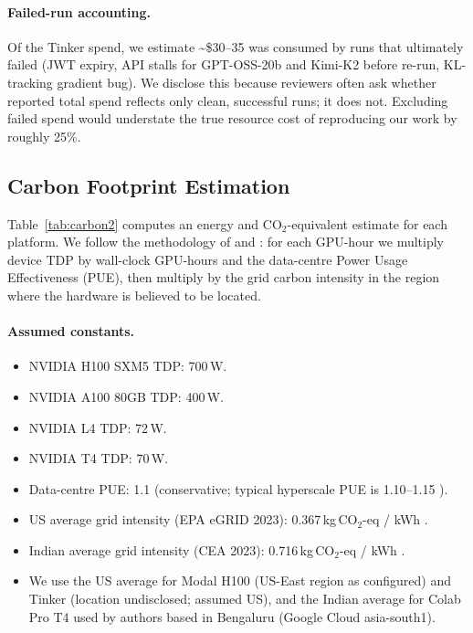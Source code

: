 \paragraph{Failed-run accounting.} Of the Tinker spend, we estimate
\textasciitilde\$30--35 was consumed by runs that ultimately failed
(JWT expiry, API stalls for GPT-OSS-20b and Kimi-K2 before re-run,
KL-tracking gradient bug). We disclose this because reviewers often ask
whether reported total spend reflects only clean, successful runs; it does
not. Excluding failed spend would understate the true resource cost of
reproducing our work by roughly 25\%.

\subsection{Carbon Footprint Estimation}
\label{sec:carbon}

Table~\ref{tab:carbon2} computes an energy and CO$_2$-equivalent estimate
for each platform. We follow the methodology of
\citet{patterson2024empirical} and \citet{strubell2019energy}: for each
GPU-hour we multiply device TDP by wall-clock GPU-hours and the data-centre
Power Usage Effectiveness (PUE), then multiply by the grid carbon intensity
in the region where the hardware is believed to be located.

\paragraph{Assumed constants.}
\begin{itemize}
  \item NVIDIA H100 SXM5 TDP: 700\,W.
  \item NVIDIA A100 80GB TDP: 400\,W.
  \item NVIDIA L4 TDP: 72\,W.
  \item NVIDIA T4 TDP: 70\,W.
  \item Data-centre PUE: 1.1 (conservative; typical hyperscale PUE is
        1.10--1.15 \cite{google2023pue, aws2023pue}).
  \item US average grid intensity (EPA eGRID 2023): 0.367\,kg\,CO$_2$-eq / kWh
        \cite{epa2023egrid}.
  \item Indian average grid intensity (CEA 2023): 0.716\,kg\,CO$_2$-eq / kWh
        \cite{cea2023co2}.
  \item We use the US average for Modal H100 (US-East region as configured)
        and Tinker (location undisclosed; assumed US), and the Indian
        average for Colab Pro T4 used by authors based in Bengaluru
        (Google Cloud asia-south1).
\end{itemize}

